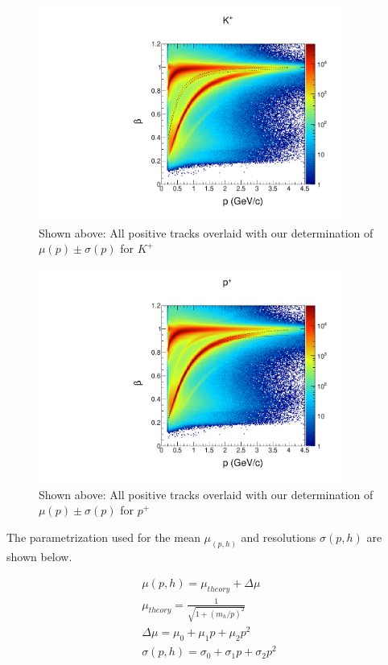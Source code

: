 \begin{figure}
  \begin{center}
    \includegraphics[width=10cm]{image/plots/hadron-id/beautiful_pbeta_kp.pdf}
    \caption{ Shown above: All positive tracks overlaid with our determination of $\mu(p) \pm \sigma(p)$ for $K^+$}
  \end{center}
\end{figure}

\begin{figure}
  \begin{center}
    \includegraphics[width=10cm]{image/plots/hadron-id/beautiful_pbeta_prot.pdf}
    \caption{ Shown above: All positive tracks overlaid with our determination of $\mu(p) \pm \sigma(p)$ for $p^+$}
  \end{center}
\end{figure}

The parametrization used for the mean $\mu_ (p,h)$ and resolutions $\sigma (p,h)$ are shown below.

\begin{eqnarray}  
  \mu (p,h) = \mu_{theory} + \Delta \mu       \\
  \mu_{theory} = \frac{1}{\sqrt{1+(m_h/p)^2}} \\
  \Delta \mu = \mu_0 + \mu_1 p + \mu_2 p^2    \\
  \sigma (p,h) = \sigma_0 + \sigma_1 p + \sigma_2 p^2
\end{eqnarray}

